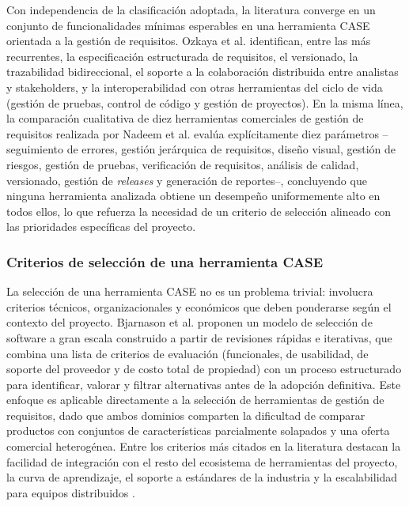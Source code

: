 \documentclass[journal,onecolumn]{IEEEtran}
\begin{document}
	Con independencia de la clasificación adoptada, la literatura converge en un conjunto de funcionalidades mínimas esperables en una herramienta CASE orientada a la gestión de requisitos. Ozkaya et al. \cite{Ozkaya2023} identifican, entre las más recurrentes, la especificación estructurada de requisitos, el versionado, la trazabilidad bidireccional, el soporte a la colaboración distribuida entre analistas y stakeholders, y la interoperabilidad con otras herramientas del ciclo de vida (gestión de pruebas, control de código y gestión de proyectos). En la misma línea, la comparación cualitativa de diez herramientas comerciales de gestión de requisitos realizada por Nadeem et al. \cite{Nadeem2022} evalúa explícitamente diez parámetros --seguimiento de errores, gestión jerárquica de requisitos, diseño visual, gestión de riesgos, gestión de pruebas, verificación de requisitos, análisis de calidad, versionado, gestión de \textit{releases} y generación de reportes--, concluyendo que ninguna herramienta analizada obtiene un desempeño uniformemente alto en todos ellos, lo que refuerza la necesidad de un criterio de selección alineado con las prioridades específicas del proyecto.
	
	\subsubsection{Criterios de selección de una herramienta CASE}
	
	La selección de una herramienta CASE no es un problema trivial: involucra criterios técnicos, organizacionales y económicos que deben ponderarse según el contexto del proyecto. Bjarnason et al. \cite{Bjarnason2023} proponen un modelo de selección de software a gran escala construido a partir de revisiones rápidas e iterativas, que combina una lista de criterios de evaluación (funcionales, de usabilidad, de soporte del proveedor y de costo total de propiedad) con un proceso estructurado para identificar, valorar y filtrar alternativas antes de la adopción definitiva. Este enfoque es aplicable directamente a la selección de herramientas de gestión de requisitos, dado que ambos dominios comparten la dificultad de comparar productos con conjuntos de características parcialmente solapados y una oferta comercial heterogénea. Entre los criterios más citados en la literatura destacan la facilidad de integración con el resto del ecosistema de herramientas del proyecto, la curva de aprendizaje, el soporte a estándares de la industria y la escalabilidad para equipos distribuidos \cite{Bjarnason2023, Ozkaya2023}.
	
\end{document}

